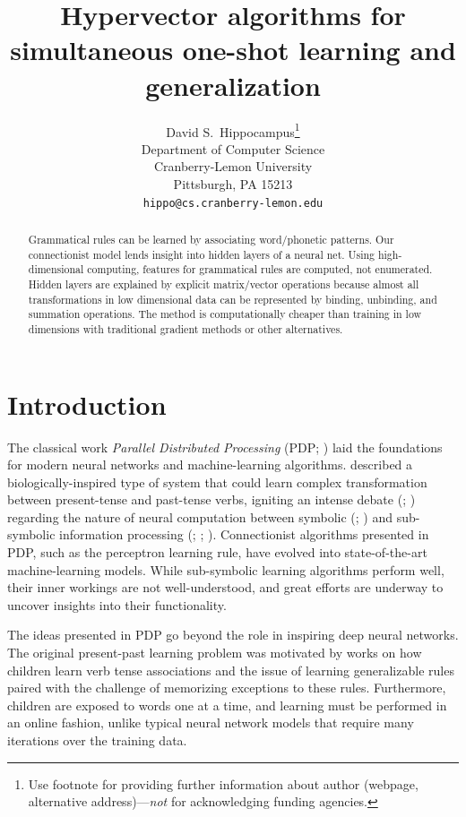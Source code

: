 \documentclass{article}
\title{Hypervector algorithms for simultaneous one-shot learning and generalization}
\author{
  David S.~Hippocampus\thanks{Use footnote for providing further
    information about author (webpage, alternative
    address)---\emph{not} for acknowledging funding agencies.} \\
  Department of Computer Science\\
  Cranberry-Lemon University\\
  Pittsburgh, PA 15213 \\
  \texttt{hippo@cs.cranberry-lemon.edu} \\
}
\begin{document}

\maketitle

\begin{abstract}
Grammatical rules can be learned by associating word/phonetic patterns. Our connectionist model lends insight into hidden layers of a neural net. Using high-dimensional computing, features for grammatical rules are computed, not enumerated. Hidden layers are explained by explicit matrix/vector operations because almost all transformations in low dimensional data can be represented by binding, unbinding, and summation operations. The method is computationally cheaper than training in low dimensions with traditional gradient methods or other alternatives.


\end{abstract}

\section{Introduction}

The classical work \emph{Parallel Distributed Processing} (PDP; \citet{McClelland1986}) laid the foundations for modern neural networks and machine-learning algorithms. 
\citet{Rumelhart1986a} described a biologically-inspired type of system that could learn complex transformation between present-tense and past-tense verbs, igniting an intense debate (\citet{Pinker1988}; \citet{Fodor1988}) regarding the nature of neural computation between symbolic (\citet{Pinker2002a}; \citet{Fodor1990}) and sub-symbolic information processing (\citet{MacWhinney1991}; \citet{Bullinaria1994}; \citet{McClelland2002}). Connectionist algorithms presented in PDP, such as the perceptron learning rule, have evolved into state-of-the-art machine-learning models. While sub-symbolic learning algorithms perform well, their inner workings are not well-understood, and great efforts are underway to uncover insights into their functionality.

The ideas presented in PDP go beyond the role in inspiring deep neural networks. The original present-past learning problem was motivated by works on how children learn verb tense associations and the issue of learning generalizable rules paired with the challenge of memorizing exceptions to these rules. Furthermore, children are exposed to words one at a time, and learning must be performed in an online fashion, unlike typical neural network models that require many iterations over the training data.
\end{document}
